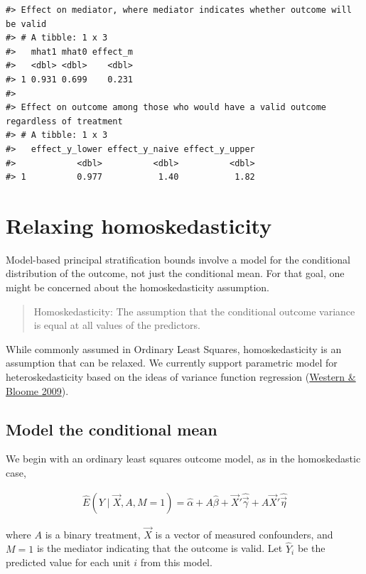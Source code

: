 \documentclass[
]{book}
\begin{document}
\begin{verbatim}
#> Effect on mediator, where mediator indicates whether outcome will be valid
#> # A tibble: 1 x 3
#>   mhat1 mhat0 effect_m
#>   <dbl> <dbl>    <dbl>
#> 1 0.931 0.699    0.231
#> 
#> Effect on outcome among those who would have a valid outcome regardless of treatment
#> # A tibble: 1 x 3
#>   effect_y_lower effect_y_naive effect_y_upper
#>            <dbl>          <dbl>          <dbl>
#> 1          0.977           1.40           1.82
\end{verbatim}

\hypertarget{relaxing-homoskedasticity}{%
\chapter{Relaxing homoskedasticity}\label{relaxing-homoskedasticity}}

Model-based principal stratification bounds involve a model for the conditional distribution of the outcome, not just the conditional mean. For that goal, one might be concerned about the homoskedasticity assumption.

\begin{quote}
Homoskedasticity: The assumption that the conditional outcome variance is equal at all values of the predictors.
\end{quote}

While commonly assumed in Ordinary Least Squares, homoskedasticity is an assumption that can be relaxed. We currently support parametric model for heteroskedasticity based on the ideas of variance function regression (\href{https://doi.org/10.1111/j.1467-9531.2009.01222.x}{Western \& Bloome 2009}).

\hypertarget{model-the-conditional-mean}{%
\section{Model the conditional mean}\label{model-the-conditional-mean}}

We begin with an ordinary least squares outcome model, as in the homoskedastic case,

\[\begin{aligned}
\hat{E}(Y\mid \vec{X},A,M = 1) = \hat\alpha + A\hat\beta  + \vec{X}'\hat{\vec\gamma} + A\vec{X}'\hat{\vec\eta}
\end{aligned}\]

where \(A\) is a binary treatment, \(\vec{X}\) is a vector of measured confounders, and \(M = 1\) is the mediator indicating that the outcome is valid. Let \(\hat{Y}_i\) be the predicted value for each unit \(i\) from this model.
\end{document}
